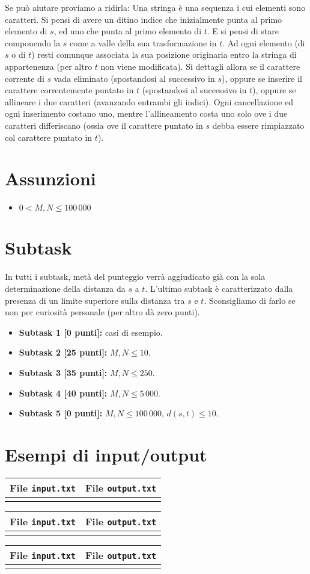 \documentclass[a4paper,11pt]{article}
\newcommand{\file}[1]{\texttt{#1}}
\newcommand{\esempio}[2]{
\noindent\begin{minipage}{\textwidth}
\begin{tabular}{|p{11cm}|p{5cm}|}
	\hline
	\textbf{File \file{input.txt}} & \textbf{File \file{output.txt}}\\
	\hline
	\tt \small #1 &
	\tt \small #2 \\
	\hline
\end{tabular}
\end{minipage}
}
\begin{document}
Se pu\`o aiutare proviamo a ridirla: Una stringa \`e una sequenza i cui elementi sono caratteri. Si pensi di avere un ditino indice che inizialmente punta al primo elemento di $s$, ed uno che punta al primo elemento di $t$.
E si pensi di stare componendo la $s$ come a valle della sua trasformazione in $t$. Ad ogni elemento (di $s$ o di $t$) resti comunque associata la sua posizione originaria entro la stringa di appartenenza (per altro $t$ non viene modificata).
Si dettagli allora se il carattere corrente di $s$ vada eliminato (spostandosi al successivo in $s$), oppure se inserire il carattere correntemente puntato in $t$ (spostandosi al successivo in $t$),
oppure se allineare i due caratteri (avanzando entrambi gli indici).
Ogni cancellazione ed ogni inserimento costano uno, mentre l'allineamento costa uno solo ove i due caratteri differiscano (ossia ove il carattere puntato in $s$ debba essere rimpiazzato col carattere puntato in $t$).

\section*{Assunzioni}
\begin{itemize}
\item $0 < M,N \le 100\,000$
\end{itemize}

\section*{Subtask}

In tutti i subtask, met\`a del punteggio verr\`a aggiudicato
gi\`a con la sola determinazione della distanza da $s$ a $t$.
L'ultimo subtask \`e caratterizzato dalla presenza di un limite superiore
sulla distanza tra $s$ e $t$. Sconsigliamo di farlo se non per curiosit\`a personale (per altro d\`a zero punti).

\begin{itemize}
\item \textbf{Subtask 1 [0 punti]:} casi di esempio.
\item \textbf{Subtask 2 [25 punti]:} $M,N \le 10$.
\item \textbf{Subtask 3 [35 punti]:} $M,N \le 250$.
\item \textbf{Subtask 4 [40 punti]:} $M,N \leq 5\,000$.
\item \textbf{Subtask 5 [0 punti]:} $M,N \leq 100\,000$, $d(s,t) \leq 10$.
\end{itemize}


\section*{Esempi di input/output}

\esempio{

}{

}

\esempio{

}{

}

\esempio{

}{

}
\end{document}
